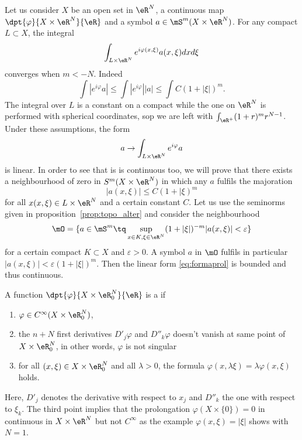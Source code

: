 Let us consider $X$ be an open set in $\eR^N$, a continuous map $\dpt{\varphi}{X\times\eR^N}{\eR}$ and a symbol $a\in\mS^{m}(X\times\eR^N)$. For any compact $L\subset X$, the integral
\[
	\int_{L\times\eR^N}e^{i\varphi(x,\xi)}a(x,\xi)dxd\xi
\]
converges when $m<-N$. Indeed
\begin{equation}
	\int |e^{i\varphi}a|\leq\int|e^{i\varphi}||a|
	\leq\int C(1+|\xi|)^m.
\end{equation}
The integral over $L$ is a constant on a compact while the one on $\eR^N$ is performed with spherical coordinates, sop we are left with $\int_{\eR^+}(1+r)^mr^{N-1}$. Under these assumptions, the form
\begin{equation}  \label{eq:formaprol}
	a\to\int_{L\times\eR^N}e^{i\varphi}a
\end{equation}
is linear. In order to see that is is continuous too, we will prove that there exists a neighbourhood of zero in $S^m(X\times\eR^N)$ in which any $a$ fulfils the majoration
\[
	|a(x,\xi)|\leq C(1+|\xi)^m
\]
for all $x(x,\xi)\in L\times\eR^N$ and a certain constant $C$. Let us use the seminorms given in proposition~\ref{prop:topo_alter}  and consider the neighbourhood
\[
	\mO=\{ a\in\mS^m\tq\sup_{x\in K,\xi\in\eR^N}(1+| \xi |)^{-m}| a(x,\xi) |<\varepsilon \}
\]
for a certain compact $K\subset X$ and $\varepsilon>0$. A symbol $a$ in $\mO$ fulfils in particular
$| a(x,\xi) |<\varepsilon(1+| \xi |)^m$. Then the linear form \eqref{eq:formaprol} is bounded and thus continuous.

\begin{definition} \label{def:phase}

	A function $\dpt{\varphi}{X\times\eR^N_0}{\eR}$ is a  if

	\begin{enumerate}
		\item $\varphi\in C^{\infty}(X\times\eR^N_0)$,
		\item the $n+N$ first derivatives $D'_j\varphi$ and $D''_k\varphi$ doesn't vanish at same point of $X\times\eR^N_0$, in other words, $\varphi$ is not singular
		\item for all $(x,\xi)\in X\times\eR^N_0$ and all $\lambda>0$, the formula $\varphi(x,\lambda\xi)=\lambda\varphi(x,\xi)$ holds.
	\end{enumerate}

\end{definition}
Here, $D'_j$ denotes the derivative with respect to $x_j$ and $D''_k$ the one with respect to $\xi_k$. The third point implies that the prolongation $\varphi(X\times\{  0\})=0$ in continuous in $X\times\eR^N$ but not $C^{\infty}$ as the example $\varphi(x,\xi)=| \xi |$ shows with $N=1$.

